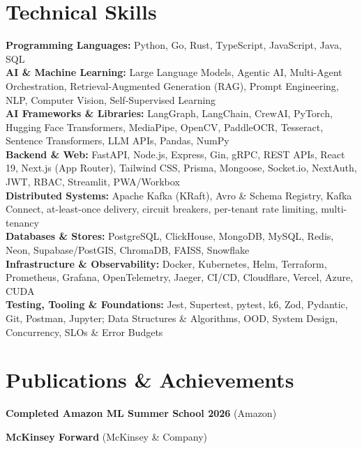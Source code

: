 \documentclass[a4paper,10pt]{article}
\begin{document}
\section{Technical Skills}
{\small
\textbf{Programming Languages:} Python, Go, Rust, TypeScript, JavaScript, Java, SQL\\[2pt]
\textbf{AI \& Machine Learning:} Large Language Models, Agentic AI, Multi-Agent Orchestration, Retrieval-Augmented Generation (RAG), Prompt Engineering, NLP, Computer Vision, Self-Supervised Learning\\[2pt]
\textbf{AI Frameworks \& Libraries:} LangGraph, LangChain, CrewAI, PyTorch, Hugging Face Transformers, MediaPipe, OpenCV, PaddleOCR, Tesseract, Sentence Transformers, LLM APIs, Pandas, NumPy\\[2pt]
\textbf{Backend \& Web:} FastAPI, Node.js, Express, Gin, gRPC, REST APIs, React 19, Next.js (App Router), Tailwind CSS, Prisma, Mongoose, Socket.io, NextAuth, JWT, RBAC, Streamlit, PWA/Workbox\\[2pt]
\textbf{Distributed Systems:} Apache Kafka (KRaft), Avro \& Schema Registry, Kafka Connect, at-least-once delivery, circuit breakers, per-tenant rate limiting, multi-tenancy\\[2pt]
\textbf{Databases \& Stores:} PostgreSQL, ClickHouse, MongoDB, MySQL, Redis, Neon, Supabase/PostGIS, ChromaDB, FAISS, Snowflake\\[2pt]
\textbf{Infrastructure \& Observability:} Docker, Kubernetes, Helm, Terraform, Prometheus, Grafana, OpenTelemetry, Jaeger, CI/CD, Cloudflare, Vercel, Azure, CUDA\\[2pt]
\textbf{Testing, Tooling \& Foundations:} Jest, Supertest, pytest, k6, Zod, Pydantic, Git, Postman, Jupyter; Data Structures \& Algorithms, OOD, System Design, Concurrency, SLOs \& Error Budgets}

\section{Publications \& Achievements}
\begin{points}
  \item \ieeepaper
  \item \textbf{Completed Amazon ML Summer School 2026} (Amazon)
  \item \textbf{McKinsey Forward} (McKinsey \& Company)
\end{points}
\end{document}
